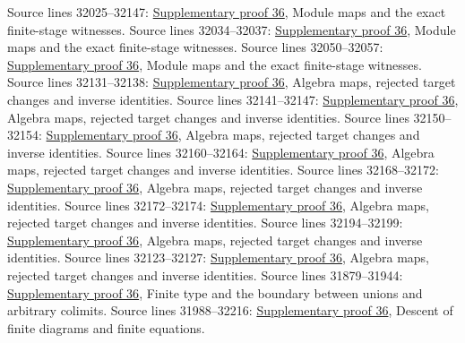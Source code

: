 \begin{AlgebraSourceRoutes}
 Source lines 32025--32147: \hyperlink{algebra_colimit_categories_notes_20260928}{Supplementary proof 36}, Module maps and the exact finite-stage witnesses.
 Source lines 32034--32037: \hyperlink{algebra_colimit_categories_notes_20260928}{Supplementary proof 36}, Module maps and the exact finite-stage witnesses.
 Source lines 32050--32057: \hyperlink{algebra_colimit_categories_notes_20260928}{Supplementary proof 36}, Module maps and the exact finite-stage witnesses.
 Source lines 32131--32138: \hyperlink{algebra_colimit_categories_notes_20260928}{Supplementary proof 36}, Algebra maps, rejected target changes and inverse identities.
 Source lines 32141--32147: \hyperlink{algebra_colimit_categories_notes_20260928}{Supplementary proof 36}, Algebra maps, rejected target changes and inverse identities.
 Source lines 32150--32154: \hyperlink{algebra_colimit_categories_notes_20260928}{Supplementary proof 36}, Algebra maps, rejected target changes and inverse identities.
 Source lines 32160--32164: \hyperlink{algebra_colimit_categories_notes_20260928}{Supplementary proof 36}, Algebra maps, rejected target changes and inverse identities.
 Source lines 32168--32172: \hyperlink{algebra_colimit_categories_notes_20260928}{Supplementary proof 36}, Algebra maps, rejected target changes and inverse identities.
 Source lines 32172--32174: \hyperlink{algebra_colimit_categories_notes_20260928}{Supplementary proof 36}, Algebra maps, rejected target changes and inverse identities.
 Source lines 32194--32199: \hyperlink{algebra_colimit_categories_notes_20260928}{Supplementary proof 36}, Algebra maps, rejected target changes and inverse identities.
 Source lines 32123--32127: \hyperlink{algebra_colimit_categories_notes_20260928}{Supplementary proof 36}, Algebra maps, rejected target changes and inverse identities.
 Source lines 31879--31944: \hyperlink{algebra_colimit_categories_notes_20260928}{Supplementary proof 36}, Finite type and the boundary between unions and arbitrary colimits.
 Source lines 31988--32216: \hyperlink{algebra_colimit_categories_notes_20260928}{Supplementary proof 36}, Descent of finite diagrams and finite equations.

\end{AlgebraSourceRoutes}
